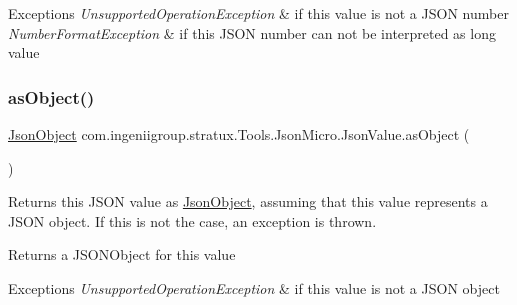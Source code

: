 \begin{DoxyExceptions}{Exceptions}
{\em Unsupported\+Operation\+Exception} & if this value is not a J\+S\+ON number \\
\hline
{\em Number\+Format\+Exception} & if this J\+S\+ON number can not be interpreted as {\ttfamily long} value \\
\hline
\end{DoxyExceptions}
\mbox{\label{classcom_1_1ingeniigroup_1_1stratux_1_1_tools_1_1_json_micro_1_1_json_value_a9b02091d2364f0e74a94ed5a6454ef9b}} 
\subsubsection{\texorpdfstring{as\+Object()}{asObject()}}
{\footnotesize\ttfamily \hyperlink{classcom_1_1ingeniigroup_1_1stratux_1_1_tools_1_1_json_micro_1_1_json_object}{Json\+Object} com.\+ingeniigroup.\+stratux.\+Tools.\+Json\+Micro.\+Json\+Value.\+as\+Object (\begin{DoxyParamCaption}{ }\end{DoxyParamCaption})}

Returns this J\+S\+ON value as \hyperlink{classcom_1_1ingeniigroup_1_1stratux_1_1_tools_1_1_json_micro_1_1_json_object}{Json\+Object}, assuming that this value represents a J\+S\+ON object. If this is not the case, an exception is thrown.

\begin{DoxyReturn}{Returns}
a J\+S\+O\+N\+Object for this value 
\end{DoxyReturn}

\begin{DoxyExceptions}{Exceptions}
{\em Unsupported\+Operation\+Exception} & if this value is not a J\+S\+ON object \\
\hline
\end{DoxyExceptions}
\mbox{\label{classcom_1_1ingeniigroup_1_1stratux_1_1_tools_1_1_json_micro_1_1_json_value_ab4d77d3c14dd5d92531ada3833717335}} 
